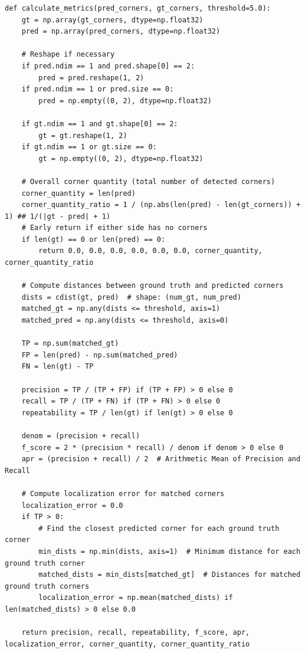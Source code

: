 \documentclass[journal]{IEEEtran}
\begin{document}
\onecolumn
\begin{lstlisting}[style=python, caption={Metric Calculations}, label={lst:optimize_across_images}]
def calculate_metrics(pred_corners, gt_corners, threshold=5.0):
    gt = np.array(gt_corners, dtype=np.float32)
    pred = np.array(pred_corners, dtype=np.float32)

    # Reshape if necessary
    if pred.ndim == 1 and pred.shape[0] == 2:
        pred = pred.reshape(1, 2)
    if pred.ndim == 1 or pred.size == 0:
        pred = np.empty((0, 2), dtype=np.float32)

    if gt.ndim == 1 and gt.shape[0] == 2:
        gt = gt.reshape(1, 2)
    if gt.ndim == 1 or gt.size == 0:
        gt = np.empty((0, 2), dtype=np.float32)

    # Overall corner quantity (total number of detected corners)
    corner_quantity = len(pred)
    corner_quantity_ratio = 1 / (np.abs(len(pred) - len(gt_corners)) + 1) ## 1/(|gt - pred| + 1)
    # Early return if either side has no corners
    if len(gt) == 0 or len(pred) == 0:
        return 0.0, 0.0, 0.0, 0.0, 0.0, 0.0, corner_quantity, corner_quantity_ratio

    # Compute distances between ground truth and predicted corners
    dists = cdist(gt, pred)  # shape: (num_gt, num_pred)
    matched_gt = np.any(dists <= threshold, axis=1)
    matched_pred = np.any(dists <= threshold, axis=0)

    TP = np.sum(matched_gt)
    FP = len(pred) - np.sum(matched_pred)
    FN = len(gt) - TP

    precision = TP / (TP + FP) if (TP + FP) > 0 else 0
    recall = TP / (TP + FN) if (TP + FN) > 0 else 0
    repeatability = TP / len(gt) if len(gt) > 0 else 0

    denom = (precision + recall)
    f_score = 2 * (precision * recall) / denom if denom > 0 else 0
    apr = (precision + recall) / 2  # Arithmetic Mean of Precision and Recall

    # Compute localization error for matched corners
    localization_error = 0.0
    if TP > 0:
        # Find the closest predicted corner for each ground truth corner
        min_dists = np.min(dists, axis=1)  # Minimum distance for each ground truth corner
        matched_dists = min_dists[matched_gt]  # Distances for matched ground truth corners
        localization_error = np.mean(matched_dists) if len(matched_dists) > 0 else 0.0

    return precision, recall, repeatability, f_score, apr, localization_error, corner_quantity, corner_quantity_ratio
\end{lstlisting}
\end{document}
